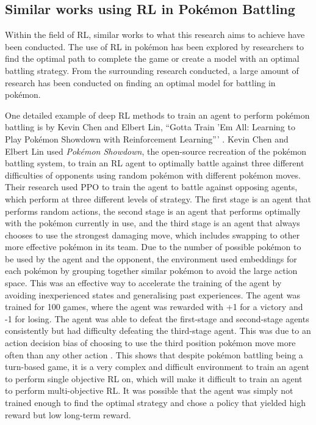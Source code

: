\subsection{Similar works using RL in Pokémon Battling}

Within the field of RL, similar works to what this research aims to achieve have been conducted. The use of RL in pokémon has been explored by researchers to find the optimal path to complete the game or create a model with an optimal battling strategy. From the surrounding research conducted, a large amount of research has been conducted on finding an optimal model for battling in pokémon. 

One detailed example of deep RL methods to train an agent to perform pokémon battling is by Kevin Chen and Elbert Lin, ``Gotta Train 'Em All: Learning to Play Pokémon Showdown with Reinforcement Learning''' \cite{chen2018gotta}. Kevin Chen and Elbert Lin used \textit{Pokémon Showdown}, the open-source recreation of the pokémon battling system, to train an RL agent to optimally battle against three different difficulties of opponents using random pokémon with different pokémon moves. Their research used PPO to train the agent to battle against opposing agents, which perform at three different levels of strategy. The first stage is an agent that performs random actions, the second stage is an agent that performs optimally with the pokémon currently in use, and the third stage is an agent that always chooses to use the strongest damaging move, which includes swapping to other more effective pokémon in its team. Due to the number of possible pokémon to be used by the agent and the opponent, the environment used embeddings for each pokémon by grouping together similar pokémon to avoid the large action space. This was an effective way to accelerate the training of the agent by avoiding inexperienced states and generalising past experiences. The agent was trained for 100 games, where the agent was rewarded with +1 for a victory and -1 for losing. The agent was able to defeat the first-stage and second-stage agents consistently but had difficulty defeating the third-stage agent. This was due to an action decision bias of choosing to use the third position pokémon move more often than any other action \cite{chen2018gotta}. This shows that despite pokémon battling being a turn-based game, it is a very complex and difficult environment to train an agent to perform single objective RL on, which will make it difficult to train an agent to perform multi-objective RL. It was possible that the agent was simply not trained enough to find the optimal strategy and chose a policy that yielded high reward but low long-term reward. 

